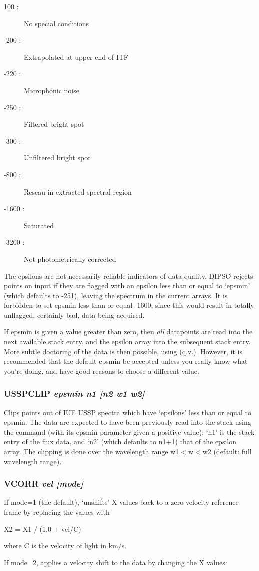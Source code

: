 \documentclass[twoside,11pt,noabs,nolof]{starlink}
\providecommand{\dipcom}[3]{\subsubsection*{\label{COM:#1}\xlabel{COM:#1}\textbf{#1} \emph{#2}}}
\newenvironment{dipdesc}{\begin{description}}{\end{description}}
\providecommand{\dipitem}[2]{ \item[{#1}] {#2} }
\begin{document}
\begin{dipdesc}
\dipitem{  100 : } {No special conditions}
\dipitem{ -200 : } {Extrapolated at upper end of ITF}
\dipitem{ -220 : } {Microphonic noise}
\dipitem{ -250 : } {Filtered bright spot}
\dipitem{ -300 : } {Unfiltered bright spot}
\dipitem{ -800 : } {Reseau in extracted spectral region}
\dipitem{-1600 : } {Saturated}
\dipitem{-3200 : } {Not photometrically corrected}
\end{dipdesc}

The epsilons are not necessarily reliable indicators of data quality.
DIPSO rejects points on input if they are flagged with an epsilon less
than or equal to `epsmin' (which defaults to -251), leaving the
spectrum in the current arrays. It is forbidden to set epsmin less
than or equal -1600, since this would result in totally unflagged,
certainly bad, data being acquired.

If epsmin is given a value greater than zero, then \emph{all}
datapoints are read into the next available stack entry, and the
epsilon array into the subsequent stack entry. More subtle doctoring
of the data is then possible, using   (q.v.). However, it is
recommended that the default epsmin be accepted unless you really know
what you're doing, and have good reasons to choose a different value.

\dipcom{USSPCLIP}{epsmin n1 [n2 w1 w2]}{Removes points from an IUE USSP spectrum based on 'epsilon' values}
Clips points out of IUE USSP spectra which have `epsilons' less than
or equal to epsmin. The data are expected to have been previously read
into the stack using the   command (with its epsmin parameter
given a positive value); `n1' is the stack entry of the flux data, and
`n2' (which defaults to n1+1) that of the epsilon array. The clipping
is done over the wavelength range w1$<$w$<$w2 (default: full
wavelength range).

\dipcom{VCORR}{vel [mode]}{Applies or removes a velocity shift to a set of X values}
If mode=1 (the default),   `unshifts' X values back to a
zero-velocity reference frame by replacing the values with

\begin{terminalv}
X2 = X1 / (1.0 + vel/C)
\end{terminalv}

where C is the velocity of light in km/s.

If mode=2,   applies a velocity shift to the data by changing the
X values:
\end{document}
